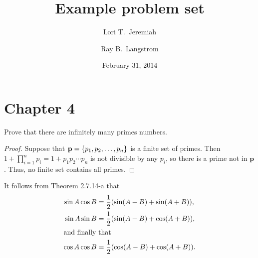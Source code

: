 \documentclass[twoside]{article}
\title{Example problem set}
\author{Lori T.~Jeremiah \and Ray B.~Langstrom} %
\date{February 31, 2014}
\begin{document}
\maketitle{}

\section*{Chapter 4}

\begin{pset}
  \begin{statement}
    Prove that there are infinitely many primes numbers.
  \end{statement}
  \begin{proof}
    Suppose that $\mathbf{p} = \{p_{1}, p_{2}, \dots, p_{n}\}$ is a finite set of primes.
    Then $1 + \prod_{i = 1}^{n} p_{i} = 1 + p_{1} p_{2} \cdots p_{n}$ is not divisible by any $p_{i}$, so there is a prime not in $\mathbf{p}$.
    Thus, no finite set contains all primes.
  \end{proof}

  It follows from Theorem 2.7.14-a that
  \begin{align*}
  \sin A \cos B &= \frac{1}{2} \pbrac*{\sin \pbrac*{A-B} + \sin \pbrac*{A+B}}, \\
  \sin A \sin B &= \frac{1}{2} \pbrac*{\sin \pbrac*{A-B} + \cos \pbrac*{A+B}}, \\
  \intertext{and finally that} %
  \cos A \cos B &= \frac{1}{2} \pbrac*{\cos \pbrac*{A-B} + \cos \pbrac*{A+B}}.
\end{align*}
\end{pset}
\end{document}
